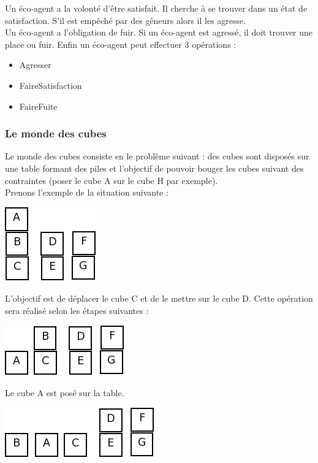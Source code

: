 \documentclass[12pt , a4paper]{article}
\begin{document}
\noindent Un éco-agent a la volonté d'être satisfait. Il cherche à se trouver dans un état de satisfaction. S'il est empêché par des gêneurs alors il les agresse.\\
Un éco-agent a l'obligation de fuir. Si un éco-agent est agressé, il doit trouver une place ou fuir.
Enfin un éco-agent peut effectuer 3 opérations :
\begin{itemize}
\item Agresser
\item FaireSatisfaction
\item FaireFuite
\end{itemize}


\subsubsection{Le monde des cubes}
Le monde des cubes consiste en le problème suivant : des cubes sont disposés sur une table formant des piles et l'objectif de pouvoir bouger les cubes suivant des contraintes (poser le cube A sur le cube H par exemple).\\
\noindent Prenons l'exemple de la situation suivante :
\begin{center}
	\includegraphics[scale=0.7]{../Image/1.png}
\end{center}
L'objectif est de déplacer le cube C et de le mettre sur le cube D. Cette opération sera réalisé selon les étapes suivantes :
\begin{center}
	\includegraphics[scale=0.7]{../Image/2.png}
\end{center}
Le cube A est posé sur la table.
\begin{center}
	\includegraphics[scale=0.7]{../Image/3.png}	
\end{center}
\end{document}
